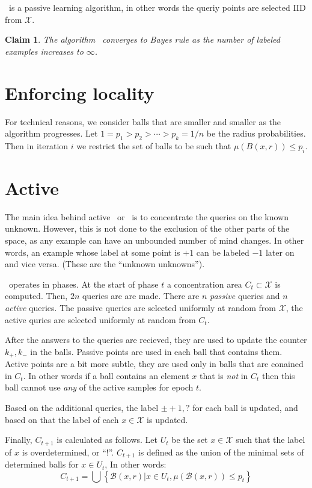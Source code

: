 \documentclass{article}
\def\X{{\mathcal X}}
\def\B{{\mathcal B}}
\newtheorem{claim}[thm]{Claim}
\begin{document}
\NNB\ is a passive learning algorithm, in other words the queriy
points are selected IID from $\X$.

\begin{claim}
  The algorithm \NNB\ converges to Bayes rule as the number of
  labeled examples increases to $\infty$.
  \end{claim}

\section{Enforcing locality}
For technical reasons, we consider balls that are smaller and smaller as the algorithm progresses. Let
$1=p_1 >p_2>\cdots >p_k=1/n$ be the radius probabilities. Then in iteration $i$ we restrict the set of balls to be such that $\mu(B(x,r)) \leq p_i$.

\section{Active \NNB}

The main idea behind active \NNB\, or \ANNB\, is to concentrate the
queries on the known unknown. However, this is not done to the
exclusion of the other parts of the space, as any example can have an
unbounded number of mind changes. In other words, an example whose label at some point is $+1$
can be labeled $-1$ later on and vice versa. (These are the ``unknown
unknowns'').

\ANNB\ operates in phases. At the start of phase $t$ a concentration
area $C_t \subset \X$ is computed. Then, $2n$ queries are are
made. There are $n$ {\em passive} queries and $n$ {\em active} queries.
The passive queries are selected uniformly at random from $\X$, the
active quries are selected uniformly at random from $C_t$.

After the answers to the queries are recieved, they are used to update
the counter $k_+,k_-$ in the balls. Passive points are used in each
ball that contains them. Active points are a bit more subtle, they are
used only in balls that are conained in $C_t$. In other words if a
ball contains an element $x$ that is {\em not} in $C_t$ then this ball
cannot use {\em any} of the active samples for epoch $t$.

Based on the additional queries, the label $\pm +1,?$ for each ball is
updated, and based on that the label of each $x \in \X$ is updated.

Finally, $C_{t+1}$ is calculated as follows. Let $U_t$ be the set $x
\in \X$ such that the label of $x$ is overdetermined, or ``!''.  $C_{t+1}$
is defined as the union of the minimal sets of determined balls for $x
\in U_t$, In other words:
\[
  C_{t+1} = \bigcup \left\{\B(x,r) | x \in U_t, \mu(\B(x,r)) \leq p_t \right\}
  \]
\end{document}
